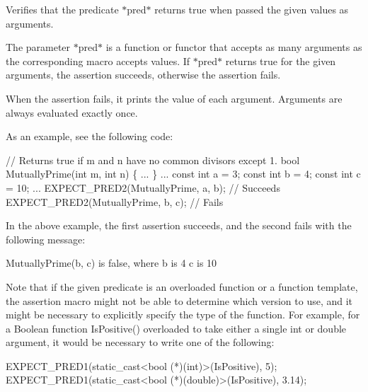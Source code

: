 Verifies that the predicate $\ast${\ttfamily pred}$\ast$ returns {\ttfamily true} when passed the given values as arguments.

The parameter $\ast${\ttfamily pred}$\ast$ is a function or functor that accepts as many arguments as the corresponding macro accepts values. If $\ast${\ttfamily pred}$\ast$ returns {\ttfamily true} for the given arguments, the assertion succeeds, otherwise the assertion fails.

When the assertion fails, it prints the value of each argument. Arguments are always evaluated exactly once.

As an example, see the following code\+:


\begin{DoxyCode}
\textcolor{comment}{// Returns true if m and n have no common divisors except 1.}
\textcolor{keywordtype}{bool} MutuallyPrime(\textcolor{keywordtype}{int} m, \textcolor{keywordtype}{int} n) \{ ... \}
...
const \textcolor{keywordtype}{int} a = 3;
\textcolor{keyword}{const} \textcolor{keywordtype}{int} b = 4;
\textcolor{keyword}{const} \textcolor{keywordtype}{int} c = 10;
...
EXPECT\_PRED2(MutuallyPrime, a, b);  \textcolor{comment}{// Succeeds}
EXPECT\_PRED2(MutuallyPrime, b, c);  \textcolor{comment}{// Fails}
\end{DoxyCode}


In the above example, the first assertion succeeds, and the second fails with the following message\+:


\begin{DoxyCode}
MutuallyPrime(b, c) is false, where
b is 4
c is 10
\end{DoxyCode}


Note that if the given predicate is an overloaded function or a function template, the assertion macro might not be able to determine which version to use, and it might be necessary to explicitly specify the type of the function. For example, for a Boolean function {\ttfamily Is\+Positive()} overloaded to take either a single {\ttfamily int} or {\ttfamily double} argument, it would be necessary to write one of the following\+:


\begin{DoxyCode}
EXPECT\_PRED1(\textcolor{keyword}{static\_cast<}\textcolor{keywordtype}{bool} (*)(\textcolor{keywordtype}{int})\textcolor{keyword}{>}(IsPositive), 5);
EXPECT\_PRED1(\textcolor{keyword}{static\_cast<}\textcolor{keywordtype}{bool} (*)(\textcolor{keywordtype}{double})\textcolor{keyword}{>}(IsPositive), 3.14);
\end{DoxyCode}


